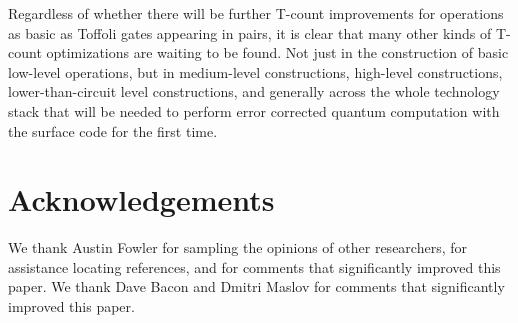 \documentclass[twocolumn]{quantumarticle-customized}
\begin{document}
Regardless of whether there will be further T-count improvements for operations as basic as Toffoli gates appearing in pairs, it is clear that many other kinds of T-count optimizations are waiting to be found.
Not just in the construction of basic low-level operations, but in medium-level constructions, high-level constructions, lower-than-circuit level constructions, and generally across the whole technology stack that will be needed to perform error corrected quantum computation with the surface code for the first time.


\section*{Acknowledgements}

We thank Austin Fowler for sampling the opinions of other researchers, for assistance locating references, and for comments that significantly improved this paper.
We thank Dave Bacon and Dmitri Maslov for comments that significantly improved this paper.



\end{document}
